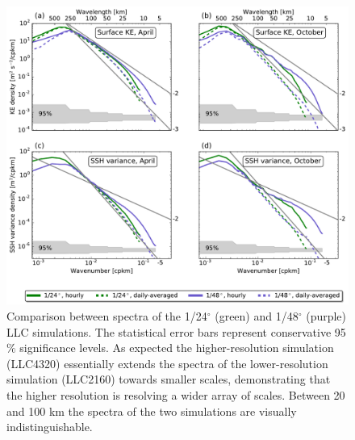 \documentclass[draft,grl]{agutexSI}
\begin{document}

%


 \begin{figure}
    \begin{center}
      \includegraphics[width=40pc]{figs/figS1.pdf}
   \caption{Comparison between spectra of the 1/24$^\circ$
   (green) and 1/48$^\circ$ (purple) LLC simulations. The statistical error bars represent conservative
   95$\%$ significance levels.  As expected the
   higher-resolution simulation (LLC4320) essentially extends the spectra of the
   lower-resolution simulation (LLC2160) towards smaller scales, demonstrating that
   the higher resolution is resolving a wider array of scales. Between 20 and 100 km
   the spectra of the two simulations are visually indistinguishable.}
   \label{figS2_3}
   \end{center}
 \end{figure}
\end{document}
